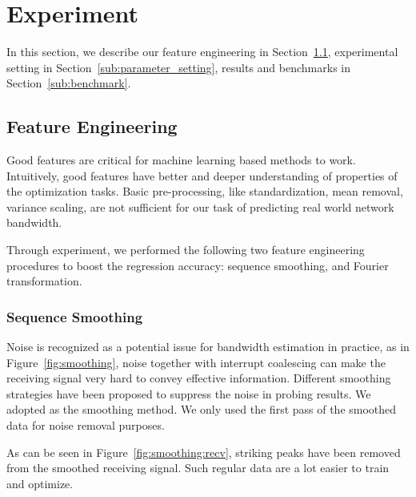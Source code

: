 \section{Experiment}
\label{sec:experiment}
In this section, we describe our feature engineering in
Section~\ref{sub:feature_engineering}, experimental setting in
Section~\ref{sub:parameter_setting}, results and benchmarks in
Section~\ref{sub:benchmark}.

\subsection{Feature Engineering}
\label{sub:feature_engineering}
Good features are critical for machine learning based methods to work.
Intuitively, good features have better and deeper understanding of properties
of the optimization tasks. Basic pre-processing, like standardization, mean
removal, variance scaling, are not sufficient for our task of predicting real
world network bandwidth.

Through experiment, we performed the following two feature engineering
procedures to boost the regression accuracy: sequence smoothing, and Fourier
transformation.

\subsubsection{Sequence Smoothing}
\label{ssub:sequence_smoothing}
Noise is recognized as a potential issue for bandwidth estimation in practice,
as in Figure~\ref{fig:smoothing}, noise together with interrupt coalescing
can make the receiving signal very hard to convey effective information.
Different smoothing strategies have been proposed to suppress the noise in
probing results. We adopted \cite{Yin2014} as the smoothing method. We only
used the first pass of the smoothed data for noise removal purposes.

As can be seen in Figure~\ref{fig:smoothing:recv}, striking peaks have been
removed from the smoothed receiving signal. Such regular data are a lot easier
to train and optimize.

